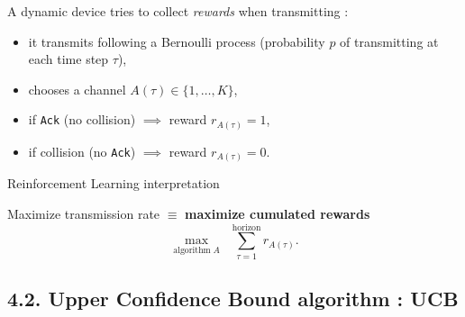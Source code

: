 \begin{frameO}

    A dynamic device tries to collect \emph{rewards} when transmitting :

    \begin{itemize}
        \tightlist
        \item
              it transmits following a Bernoulli process \newline
              (probability \(p\) of transmitting at each time step \(\tau\)),
        \item
              chooses a channel \(A(\tau) \in \{1,\dots,K\}\),
        \item
              if \texttt{Ack} (no collision) \hspace*{10pt} \(\implies\) reward
              \(r_{A(\tau)} = 1\),
        \item
              if collision (no \texttt{Ack}) \hspace*{10pt} \(\implies\) reward
              \(r_{A(\tau)} = 0\).
    \end{itemize}


    \begin{colorblock}{Reinforcement Learning interpretation}

        Maximize transmission rate \(\equiv\) \textbf{maximize cumulated
            rewards}
        \[\max_{\text{algorithm}\;A} \;\; \sum_{\tau=1}^{\text{horizon}} r_{A(\tau)}.\]

    \end{colorblock}

\end{frameO}

\subsection{\hfill{}4.2. Upper Confidence Bound algorithm : UCB\hfill{}}

